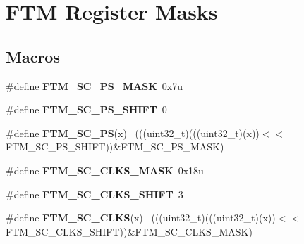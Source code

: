 \hypertarget{group___f_t_m___register___masks}{}\section{F\+T\+M Register Masks}
\label{group___f_t_m___register___masks}
\subsection*{Macros}
\begin{DoxyCompactItemize}
\item 
\hypertarget{group___f_t_m___register___masks_ga6d12f2131f28899f9d18b8e7fe12349f}{}\#define {\bfseries F\+T\+M\+\_\+\+S\+C\+\_\+\+P\+S\+\_\+\+M\+A\+S\+K}~0x7u\label{group___f_t_m___register___masks_ga6d12f2131f28899f9d18b8e7fe12349f}

\item 
\hypertarget{group___f_t_m___register___masks_ga8c61fdf29e7bfcc3b61c9b3cc86019b6}{}\#define {\bfseries F\+T\+M\+\_\+\+S\+C\+\_\+\+P\+S\+\_\+\+S\+H\+I\+F\+T}~0\label{group___f_t_m___register___masks_ga8c61fdf29e7bfcc3b61c9b3cc86019b6}

\item 
\hypertarget{group___f_t_m___register___masks_gac5bcb12f03c653d0e70e5420160cf26e}{}\#define {\bfseries F\+T\+M\+\_\+\+S\+C\+\_\+\+P\+S}(x)                                                      ~(((uint32\+\_\+t)(((uint32\+\_\+t)(x))$<$$<$F\+T\+M\+\_\+\+S\+C\+\_\+\+P\+S\+\_\+\+S\+H\+I\+F\+T))\&F\+T\+M\+\_\+\+S\+C\+\_\+\+P\+S\+\_\+\+M\+A\+S\+K)\label{group___f_t_m___register___masks_gac5bcb12f03c653d0e70e5420160cf26e}

\item 
\hypertarget{group___f_t_m___register___masks_ga4a0ff5e0b4f7181e51e0139abfa6d7d3}{}\#define {\bfseries F\+T\+M\+\_\+\+S\+C\+\_\+\+C\+L\+K\+S\+\_\+\+M\+A\+S\+K}~0x18u\label{group___f_t_m___register___masks_ga4a0ff5e0b4f7181e51e0139abfa6d7d3}

\item 
\hypertarget{group___f_t_m___register___masks_ga9c8973dcfd297dfda1f057c14e1deb4b}{}\#define {\bfseries F\+T\+M\+\_\+\+S\+C\+\_\+\+C\+L\+K\+S\+\_\+\+S\+H\+I\+F\+T}~3\label{group___f_t_m___register___masks_ga9c8973dcfd297dfda1f057c14e1deb4b}

\item 
\hypertarget{group___f_t_m___register___masks_ga3129932b4758f01371fc729982aee834}{}\#define {\bfseries F\+T\+M\+\_\+\+S\+C\+\_\+\+C\+L\+K\+S}(x)                                                  ~(((uint32\+\_\+t)(((uint32\+\_\+t)(x))$<$$<$F\+T\+M\+\_\+\+S\+C\+\_\+\+C\+L\+K\+S\+\_\+\+S\+H\+I\+F\+T))\&F\+T\+M\+\_\+\+S\+C\+\_\+\+C\+L\+K\+S\+\_\+\+M\+A\+S\+K)\label{group___f_t_m___register___masks_ga3129932b4758f01371fc729982aee834}


\end{DoxyCompactItemize}
